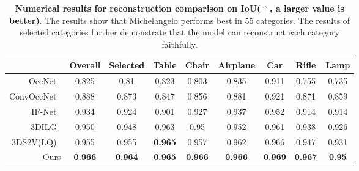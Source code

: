 \documentclass[../../book-main.tex]{subfiles}
\begin{document}
\begin{table}[th]
\centering
\resizebox{1\columnwidth}{!}
{
\begin{tabular}{rcccccccc}
    \hline
    & Overall & Selected & Table & Chair & Airplane & Car & Rifle
    & Lamp   \\ \hline
    OccNet~\cite{8953655}
    & 0.825 & 0.81 & 0.823 & 0.803 & 0.835 & 0.911 & 0.755 & 0.735  \\
    ConvOccNet~\cite{10.1007/978-3-030-58580-8_31}
    & 0.888 & 0.873 & 0.847 & 0.856 & 0.881 & 0.921 & 0.871 & 0.859  \\
    IF-Net~\cite{9156292}
    & 0.934 & 0.924 & 0.901 & 0.927 & 0.937 & 0.952 & 0.914 & 0.914 \\
    3DILG~\cite{NEURIPS2022_894ca1c4}
    & 0.950 & 0.948 & 0.963 & 0.95 & 0.952 & 0.961 & 0.938 & 0.926 \\
    3DS2V(LQ)~\cite{10.1145/3592442}
    & 0.955 & 0.955 & \textbf{0.965} & 0.957 & 0.962 & 0.966 &
    0.947 & 0.931 \\
    Ours
    & \textbf{0.966} & \textbf{0.964} & \textbf{0.965} &
    \textbf{0.966} & \textbf{0.966} & \textbf{0.969} &
    \textbf{0.967} & \textbf{0.95} \\ \hline
\end{tabular}
}
\caption{\textbf{Numerical results for reconstruction comparison on
IoU($\uparrow$, a larger value is better)}. The results show that
Michelangelo performs best in 55 categories. The results of selected
categories further demonstrate that the model can reconstruct each
category faithfully.}
\label{tab:michelangelo_recon}
\end{table}
\end{document}
